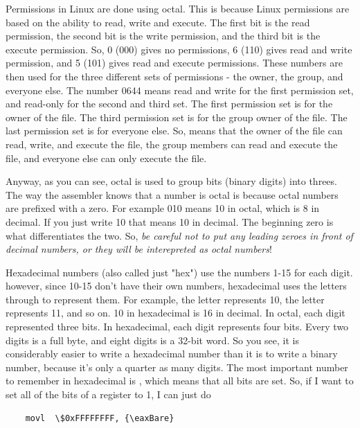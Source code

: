 Permissions in Linux
are done using octal.  This is because Linux permissions are based on the 
ability to read, write and execute.  The first bit is the read permission,
the second bit is the write permission, and the third bit is the execute
permission.  So, 0 (000) gives no permissions, 6 (110) gives read and
write permission, and 5 (101) gives read and execute permissions.
These numbers are then used for the three different sets of permissions - the
owner, the group, and everyone else.
The number 0644 means read and write
for the first permission set, and read-only for the second and third set.  
The first permission set is for the owner of the file.  The
third permission set is for the group owner of the file.  The last 
permission set is for everyone else.  So, 
means that the owner of the file can read, write, and execute the
file, the group members can read and execute the file, and everyone
else can only execute the file. 

Anyway, as you can see, octal is used to group bits (binary digits)
into threes.  The way the assembler knows that a number is octal is
because octal numbers are prefixed with a zero.
For example 010 means 10 in octal, which
is 8 in decimal. If you just write 10 that means 10 in decimal.  The
beginning zero is what differentiates the two.
So, \emph{be careful not to put any leading zeroes in front of decimal
numbers, or they will be interepreted as octal numbers}!

Hexadecimal numbers (also called just "hex") 
use the numbers 1-15 for each digit.  however,
since 10-15 don't have their own numbers, hexadecimal uses the
letters  through  to represent
them.  For example, the letter  represents 10, the
letter  represents 11, and so on.  10 in hexadecimal
is 16 in decimal.  In octal, each digit represented three bits.  In
hexadecimal, each digit represents four bits.  Every two digits is 
a full byte, and eight digits is a 32-bit word.  So you see, it
is considerably easier to write a hexadecimal number than it is
to write a binary number, because it's only a quarter as many digits.  
The most important number to remember in
hexadecimal is , which means that all bits are
set.  So, if I want to set all of the bits of a register to 1, I
can just do

\begin{simpletyping}
\begin{lstlisting}
	movl  \$0xFFFFFFFF, {\eaxBare}
\end{lstlisting}
\end{simpletyping}


